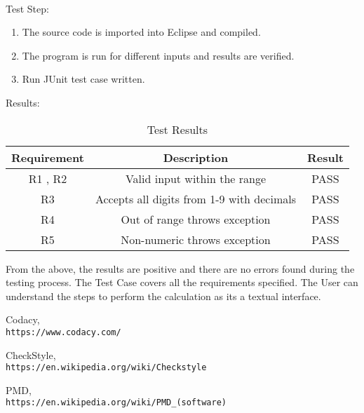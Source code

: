 \documentclass[12pt]{report}
\begin{document}
\paragraph{}Test Step:
\begin{enumerate}
    \item The source code is imported into Eclipse and compiled.
    \item The program is run for different inputs and results are verified.
    \item Run JUnit test case written.
\end{enumerate}

Results:
\begin{table}[h]
\centering
\begin{tabular}{|c |c| c|} 
\hline
 Requirement & Description & Result \\ [0.5ex] 
\hline
R1 , R2 & Valid input within the range & PASS\\
R3 & Accepts all digits from 1-9 with decimals & PASS\\
R4 & Out of range throws exception & PASS\\
R5 & Non-numeric throws exception & PASS\\
\hline
\end{tabular}
\caption{Test Results}
\label{tab:my_label}
\end{table}

From the above, the results are positive and there are no errors found during the testing process. The Test Case covers all the requirements specified. The User can understand the steps to perform the calculation as its a textual interface.

\begin{thebibliography}{9}
Codacy,
\\\texttt{https://www.codacy.com/}

CheckStyle,
\\\texttt{https://en.wikipedia.org/wiki/Checkstyle}

PMD,
\\\texttt{https://en.wikipedia.org/wiki/PMD\_(software)}

\end{thebibliography}
\end{document}
